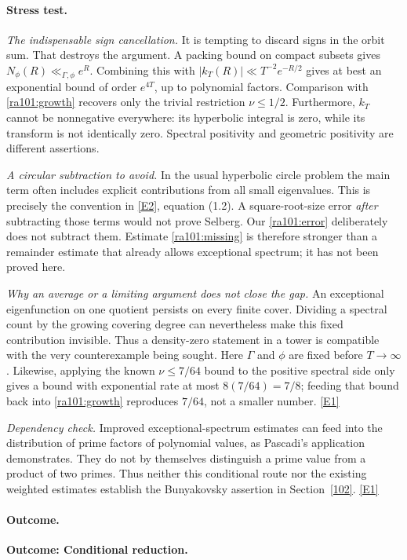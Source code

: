 \documentclass[11pt]{article}
\newcommand{\eref}[2]{\hyperlink{extra:#1:#2}{[E#2]}}
\begin{document}
\paragraph{Stress test.}
\emph{The indispensable sign cancellation.}
It is tempting to discard signs in the orbit sum. That destroys the argument.
A packing bound on compact subsets gives $N_\phi(R)\ll_{\Gamma,\phi}e^R$.
Combining this with $|k_T(R)|\ll T^{-2}e^{-R/2}$ gives at best an exponential
bound of order $e^{4T}$, up to polynomial factors. Comparison with
\eqref{ra101:growth} recovers only the trivial restriction $\nu\le1/2$.
Furthermore, $k_T$ cannot be nonnegative everywhere: its hyperbolic integral
is zero, while its transform is not identically zero. Spectral positivity
and geometric positivity are different assertions.

\emph{A circular subtraction to avoid.}
In the usual hyperbolic circle problem the main term often includes explicit
contributions from all small eigenvalues. This is precisely the convention
in \eref{101}{2}, equation (1.2). A square-root-size error \emph{after}
subtracting those terms would not prove Selberg. Our
\eqref{ra101:error} deliberately does not subtract them. Estimate
\eqref{ra101:missing} is therefore stronger than a remainder estimate that
already allows exceptional spectrum; it has not been proved here.

\emph{Why an average or a limiting argument does not close the gap.}
An exceptional eigenfunction on one quotient persists on every finite cover.
Dividing a spectral count by the growing covering degree can nevertheless
make this fixed contribution invisible. Thus a density-zero statement in a
tower is compatible with the very counterexample being sought. Here $\Gamma$
and $\phi$ are fixed before $T\to\infty$. Likewise, applying the known
$\nu\le7/64$ bound to the positive spectral side only gives a bound with
exponential rate at most $8(7/64)=7/8$; feeding that bound back into
\eqref{ra101:growth} reproduces $7/64$, not a smaller number.
\eref{101}{1}

\emph{Dependency check.}
Improved exceptional-spectrum estimates can feed into the distribution of
prime factors of polynomial values, as Pascadi's application demonstrates.
They do not by themselves distinguish a prime value from a product of two
primes. Thus neither this conditional route nor the existing weighted
estimates establish the Bunyakovsky assertion in Section~\ref{102}.
\eref{101}{1}

\paragraph{Outcome.}
\textbf{Outcome: Conditional reduction.}
\end{document}
